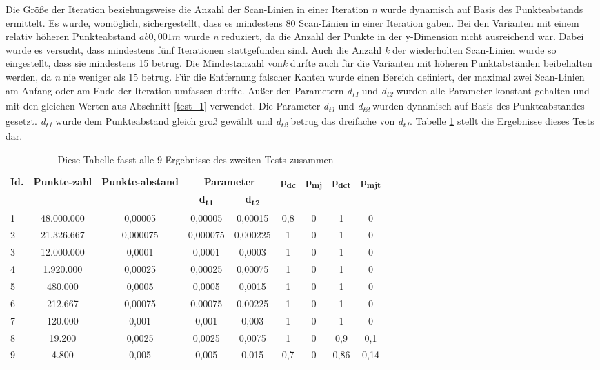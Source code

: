 Die Größe der Iteration beziehungsweise die Anzahl der Scan-Linien in einer Iteration \textit{n} wurde dynamisch auf Basis des Punkteabstands ermittelt. Es wurde, womöglich, sichergestellt, dass es mindestens 80 Scan-Linien in einer Iteration gaben. Bei den Varianten mit einem relativ höheren Punkteabstand \(ab 0,001m\) wurde \textit{n} reduziert, da die Anzahl der Punkte in der y-Dimension nicht ausreichend war. Dabei wurde es versucht, dass mindestens fünf Iterationen stattgefunden sind. Auch die Anzahl \textit{k} der wiederholten Scan-Linien wurde so eingestellt, dass sie mindestens 15 betrug. Die Mindestanzahl von\textit{k} durfte auch für die Varianten mit höheren Punktabständen beibehalten werden, da \textit{n} nie weniger als 15 betrug. Für die Entfernung falscher Kanten wurde einen Bereich definiert, der maximal zwei Scan-Linien am Anfang oder am Ende der Iteration umfassen durfte. Außer den Parametern \textit{d\textsubscript{t1}} und \textit{d\textsubscript{t2}} wurden alle Parameter konstant gehalten und mit den gleichen Werten aus Abschnitt \ref{test_1} verwendet. Die Parameter \textit{d\textsubscript{t1}} und \textit{d\textsubscript{t2}} wurden dynamisch auf Basis des Punkteabstandes gesetzt. \textit{d\textsubscript{t1}} wurde dem Punkteabstand gleich groß gewählt und \textit{d\textsubscript{t2}} betrug das dreifache von \textit{d\textsubscript{t1}}. Tabelle \ref{table: test_2_results} stellt die Ergebnisse dieses Tests dar.

\begin{table}[t]
	\centering
	\begin{tabular}[width = \textwidth]{l *{8}{c}}
		\hline
		\multirow{2}{2em}{\textbf{Id.}} & \multirow{2}{3em}{\textbf{Punkte-zahl}} & \multirow{2}{3em}{\textbf{Punkte-abstand}} & \multicolumn{2}{c}{\textbf{Parameter}} & \multirow{2}{*}{\textbf{p\textsubscript{dc}}} & \multirow{2}{*}{\textbf{p\textsubscript{mj}}} & \multirow{2}{*}{\textbf{p\textsubscript{dct}}} & \multirow{2}{*}{\textbf{p\textsubscript{mjt}}} \\
		& & & \textbf{d\textsubscript{t1}} &\textbf{d\textsubscript{t2}} & & & & \\
		\hline
		1 & 48.000.000 & 0,00005 & 0,00005 & 0,00015 & 0,8 & 0 & 1 & 0 \\
		2 & 21.326.667 & 0,000075 & 0,000075 & 0,000225 & 1 & 0 & 1 & 0 \\
		3 & 12.000.000 & 0,0001 & 0,0001 & 0,0003 & 1 & 0 & 1 & 0 \\
		4 & 1.920.000 & 0,00025 & 0,00025 & 0,00075 & 1 & 0 & 1 & 0 \\
		5 & 480.000 & 0,0005 & 0,0005 & 0,0015 & 1 & 0 & 1 & 0 \\
		6 & 212.667 & 0,00075 & 0,00075 & 0,00225 & 1 & 0 & 1 & 0 \\
		7 & 120.000 & 0,001	& 0,001 & 0,003 & 1 & 0 & 1 & 0 \\
		8 & 19.200 & 0,0025 & 0,0025 & 0,0075 & 1 & 0 & 0,9 & 0,1 \\
		9 & 4.800 & 0,005 & 0,005 & 0,015 & 0,7 & 0 & 0,86 & 0,14 \\
		\hline 
	\end{tabular}
	\caption{Diese Tabelle fasst alle 9 Ergebnisse des zweiten Tests zusammen}
	\label{table: test_2_results}
\end{table}

